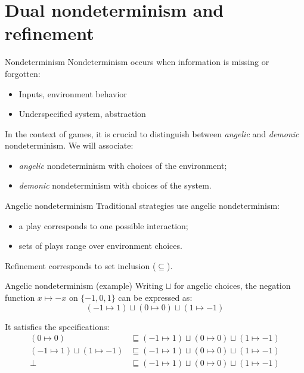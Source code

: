 \documentclass{beamer}
\begin{document}

\section*{Dual nondeterminism and refinement} %

\begin{frame}{Nondeterminism} %
  Nondeterminism occurs
  when information is missing or forgotten:
  \begin{itemize}
    \item Inputs, environment behavior
    \item Underspecified system, abstraction
  \end{itemize}

  In the context of games,
  it is crucial to distinguish between
  \emph{angelic} and \emph{demonic}
  nondeterminism.
  We will associate:
  \begin{itemize}
    \item \emph{angelic} nondeterminism
      with choices of the environment;
    \item \emph{demonic} nondeterminism
      with choices of the system.
  \end{itemize}
\end{frame}

\begin{frame}{Angelic nondeterminism} %
  Traditional strategies use angelic nondeterminism:
  \begin{itemize}
    \item a play corresponds to one possible interaction;
    \item sets of plays range over environment choices.
  \end{itemize}
  Refinement corresponds to set inclusion ($\subseteq$).
\end{frame}

\begin{frame}{Angelic nondeterminism (example)} %
  Writing $\sqcup$ for angelic choices,
  the negation function $x \mapsto - x$ on $\{-1, 0, 1\}$
  can be expressed as:
  \[
    (-1 \mapsto 1) \sqcup (0 \mapsto 0) \sqcup (1 \mapsto -1)
  \]

  It satisfies the specifications:
  \begin{align*}
    (0 \mapsto 0) &\sqsubseteq
      (-1 \mapsto 1) \sqcup (0 \mapsto 0) \sqcup (1 \mapsto -1) \\
    (-1 \mapsto 1) \sqcup (1 \mapsto -1) &\sqsubseteq
      (-1 \mapsto 1) \sqcup (0 \mapsto 0) \sqcup (1 \mapsto -1) \\
    \bot &\sqsubseteq
      (-1 \mapsto 1) \sqcup (0 \mapsto 0) \sqcup (1 \mapsto -1)
  \end{align*}
\end{frame}
\end{document}
